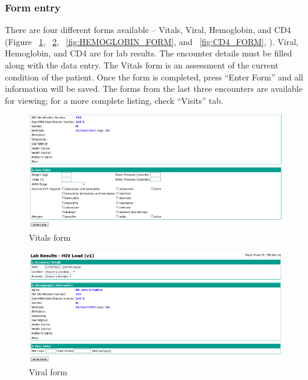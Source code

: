 \documentclass[12pt,letterpaper]{article}
\begin{document}
\subsubsection{Form entry}
	There are four different forms available – Vitals, Viral, Hemoglobin, and CD4 (Figure ~\ref{fig:VITALS_FORM}, 
	~\ref{fig:VIRAL_FORM}, ~\ref{fig:HEMOGLOBIN_FORM}, 
	and ~\ref{fig:CD4_FORM}, 
	). Viral, Hemoglobin, and CD4 are for lab results. The encounter details must be filled along with the data entry. The Vitals form is an assessment of the current condition of the patient. Once the form is completed, press “Enter Form” and all information will be saved. 
	The forms from the last three encounters are available for viewing; for a more complete listing, check “Visits” tab.

\begin{figure}\begin{center}
\includegraphics[width=6.5in]{user_guide/vitals_form.png}
\end{center}
\caption{Vitals form}
\label{fig:VITALS_FORM}
\end{figure}

\begin{figure}\begin{center}
\includegraphics[width=6.5in]{user_guide/viral_form.png}
\end{center}
\caption{Viral form}
\label{fig:VIRAL_FORM}
\end{figure}
\end{document}

